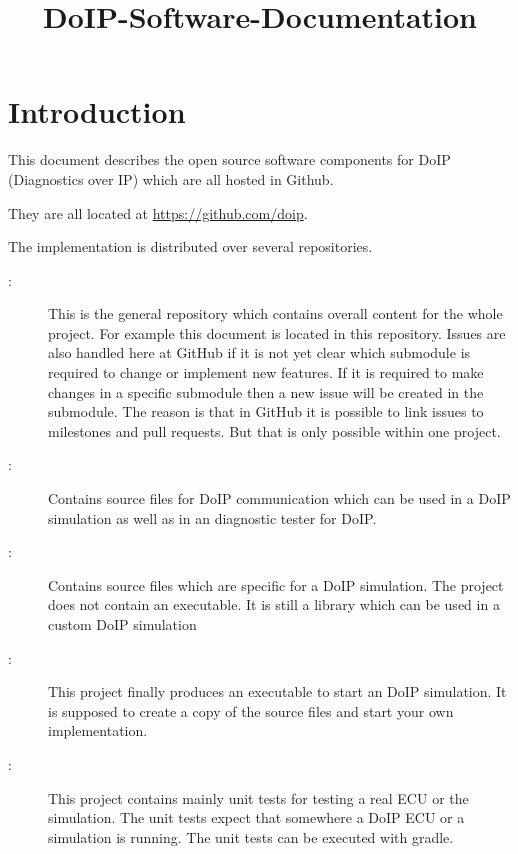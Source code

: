 \documentclass[a4paper]{doipdoc}
\title{DoIP-Software-Documentation}
\begin{document}
\maketitle

\tableofcontents

\section{Introduction}

	This document describes the open source software components for
	DoIP (Diagnostics over IP) which are all hosted in Github.

	They are all located at \url{https://github.com/doip}.

	The implementation is distributed over several repositories.
	
	\begin{description}
		
		\item[:] This is the general repository which contains
		overall content for the whole project. For example this document
		is located in this repository. Issues are also handled here at
		GitHub if it is not yet clear which submodule is required to
		change or implement new features. If it is required to make changes
		in a specific submodule then a new issue will be created in the 
		submodule. The reason is that in GitHub it is possible to link
		issues to milestones and pull requests. But that is only possible
		within one project.

		\item[:] Contains source files for DoIP
		communication which can be used in a DoIP simulation as well as
		in an diagnostic tester for DoIP.

		\item[:] Contains source files which are
		specific for a DoIP simulation. The project does not contain an
		executable. It is still a library which can be used in a custom
		DoIP simulation

		\item[:] This project finally produces
		an executable to start an DoIP simulation. It is supposed to create 
		a copy of the source files and start your own implementation.

		\item[:] This project contains mainly unit tests
		for testing a real ECU or the simulation. The unit tests expect
		that somewhere a DoIP ECU or a simulation is running. The unit tests
		can be executed with gradle.


\end{description}
\end{document}
